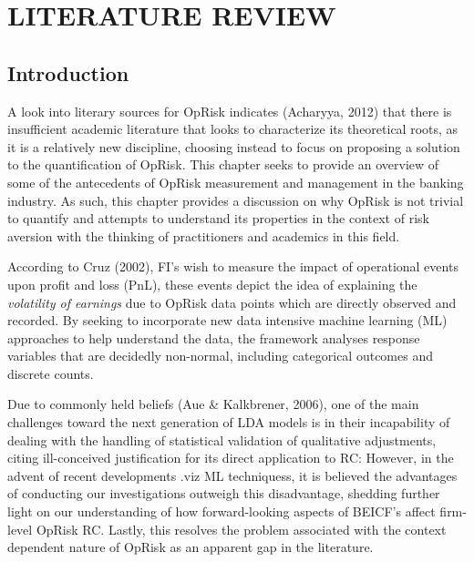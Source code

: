 \documentclass{DissertateUSU}
\begin{document}
\FloatBarrier
\newpage
{}
\fancyhead[R]{\thepage}
\fancyfoot[C]{}

\chapter{LITERATURE REVIEW}
\label{LITERATURE REVIEW}

\doublespacing

\section{Introduction}
\label{sec2:Introduction}

A look into literary sources for OpRisk indicates (Acharyya, 2012) that
there is insufficient academic literature that looks to characterize its
theoretical roots, as it is a relatively new discipline, choosing
instead to focus on proposing a solution to the quantification of
OpRisk. This chapter seeks to provide an overview of some of the
antecedents of OpRisk measurement and management in the banking
industry. As such, this chapter provides a discussion on why OpRisk is
not trivial to quantify and attempts to understand its properties in the
context of risk aversion with the thinking of practitioners and
academics in this field.\medskip

According to Cruz (2002), FI's wish to measure the impact of operational
events upon profit and loss (PnL), these events depict the idea of
explaining the \emph{volatility of earnings} due to OpRisk data points
which are directly observed and recorded. By seeking to incorporate new
data intensive machine learning (ML) approaches to help understand the
data, the framework analyses response variables that are decidedly
non-normal, including categorical outcomes and discrete counts.\medskip

Due to commonly held beliefs (Aue \& Kalkbrener, 2006), one of the main
challenges toward the next generation of LDA models is in their
incapability of dealing with the handling of statistical validation of
qualitative adjustments, citing ill-conceived justification for its
direct application to RC: However, in the advent of recent developments
.viz ML techniquess, it is believed the advantages of conducting our
investigations outweigh this disadvantage, shedding further light on our
understanding of how forward-looking aspects of BEICF's affect
firm-level OpRisk RC. Lastly, this resolves the problem associated with
the context dependent nature of OpRisk as an apparent gap in the
literature.
\end{document}
